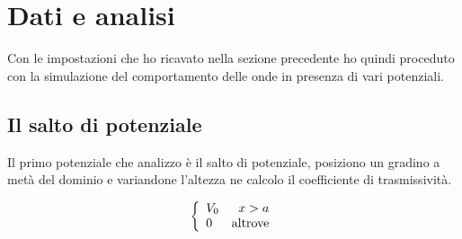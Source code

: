 \section{Dati e analisi}
Con le impostazioni che ho ricavato nella sezione precedente ho quindi proceduto con la simulazione del comportamento delle onde in presenza di vari potenziali.
\subsection{Il salto di potenziale}
Il primo potenziale che analizzo \`e il salto di potenziale, posiziono un gradino a met\`a del dominio e variandone l'altezza ne calcolo il coefficiente di trasmissivit\`a.

\begin{equation}
  \lr\{.{\begin{array}{lr}
      V_0& x>a\\
      0&\text{altrove}
  \end{array}}
\end{equation}


